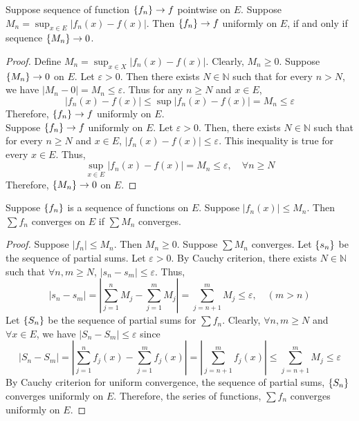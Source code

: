\begin{theorem}
	Suppose sequence of function $\left\{f_n\right\} \to f$ pointwise on $E$.
	Suppose $\displaystyle M_n = \sup_{x \in E} \left|f_n(x) - f(x)\right|$.
	Then $\left\{f_n\right\} \to f$ uniformly on $E$, if and only if sequence $\left\{M_n\right\} \to 0$.
\end{theorem}
\begin{proof}
	Define $\displaystyle M_n = \sup_{x \in X} |f_n(x) - f(x)|$.
	Clearly, $M_n \ge 0$.
	Suppose $\left\{M_n\right\} \to 0$ on $E$.
	Let $\varepsilon > 0$.
	Then there exists $N \in \mathbb{N}$ such that for every $n > N$,  we have $|M_n - 0| = M_n \le \varepsilon$.
	Thus for any $n \ge N$ and $x \in E$,
	\[ |f_n(x) - f(x)| \le \sup |f_n(x) - f(x)| = M_n \le \varepsilon \]
	Therefore, $\left\{f_n\right\} \to f$ uniformly on $E$.\\

	Suppose $\left\{f_n\right\} \to f$ uniformly on $E$.
	Let $\varepsilon > 0$.
	Then, there exists $N \in \mathbb{N}$ such that for every $n \ge N$ and $x \in E$, $|f_n(x) -f(x)| \le \varepsilon$.
	This inequality is true for every $x \in E$.
	Thus,
	\[ \sup_{x \in E} \left| f_n(x) - f(x) \right| = M_n \le \varepsilon,\quad \forall n \ge N \]
	Therefore, $\left\{M_n\right\} \to 0$ on $E$.
\end{proof}

\begin{theorem}
	Suppose $\left\{f_n\right\}$ is a sequence of functions on $E$.
	Suppose $|f_n(x)| \le M_n$.
	Then $\sum f_n$ converges on $E$ if $\sum M_n$ converges.
\end{theorem}
\begin{proof}
	Suppose $|f_n| \le M_n$.
	Then $M_n \ge 0$.
	Suppose $\sum M_n$ converges.
	Let $\left\{s_n\right\}$ be the sequence of partial sums.
	Let $\varepsilon > 0$.
	By Cauchy criterion, there exists $N \in \mathbb{N}$ such that $\forall n,m \ge N$, $|s_n - s_m| \le \varepsilon$.
	Thus,
	\[ |s_n - s_m| = \left| \sum_{j = 1}^n M_j - \sum_{j = 1}^m M_j \right| =  \sum_{j = n+1}^m M_j \le \varepsilon,\quad ( m > n )\]
	Let $\left\{S_n\right\}$ be the sequence of partial sums for $\sum f_n$.
	Clearly, $\forall n,m \ge N$ and $\forall x \in E$, we have $|S_n-S_m| \le \varepsilon$ since
	\[ |S_n - S_m| = \left|\sum_{j = 1}^n f_j(x) - \sum_{j = 1}^m f_j(x) \right| = \left| \sum_{j = n+1}^m f_j(x) \right| \le \sum_{j = n+1}^m M_j \le \varepsilon \]
	By Cauchy criterion for uniform convergence, the sequence of partial sums, $\left\{S_n\right\}$ converges uniformly on $E$.
	Therefore, the series of functions, $\sum f_n$ converges uniformly on $E$.
\end{proof}

